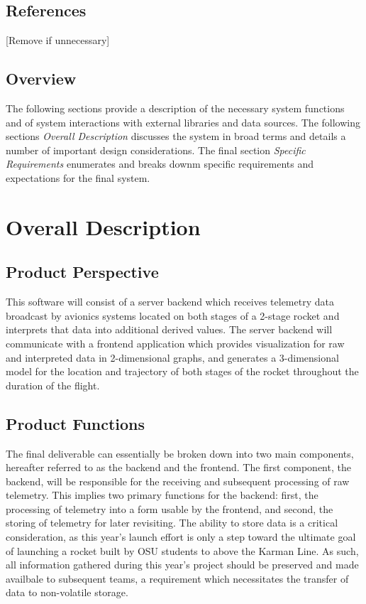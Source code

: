 \documentclass[onecolumn, draftclsnofoot,10pt, compsoc]{IEEEtran}
\begin{document}
		\subsection{References}
			[Remove if unnecessary]

		\subsection{Overview}
			The following sections provide a description of the necessary system functions and of system interactions with external libraries and data sources.
			The following sections \textit{Overall Description} discusses the system in broad terms and details a number of important design considerations. 
			The final section \textit{Specific Requirements} enumerates and breaks downm specific requirements and expectations for the final system.


	\newpage
	\section{Overall Description}
		\subsection{Product Perspective}
			This software will consist of a server backend which receives telemetry data broadcast by avionics systems located on both stages of a 2-stage rocket and interprets that data into additional derived values. 
			The server backend will communicate with a frontend application which provides visualization for raw and interpreted data in 2-dimensional graphs, and generates a 3-dimensional model for the location and trajectory of both stages of the rocket throughout the duration of the flight.

		\subsection{Product Functions}
			The final deliverable can essentially be broken down into two main components, hereafter referred to as the backend and the frontend.
			The first component, the backend, will be responsible for the receiving and subsequent processing of raw telemetry.
			This implies two primary functions for the backend: first, the processing of telemetry into a form usable by the frontend, and second, the storing of telemetry for later revisiting.
			The ability to store data is a critical consideration, as this year's launch effort is only a step toward the ultimate goal of launching a rocket built by OSU students to above the Karman Line.
			As such, all information gathered during this year's project should be preserved and made availbale to subsequent teams, a requirement which necessitates the transfer of data to non-volatile storage.
			
\end{document}
